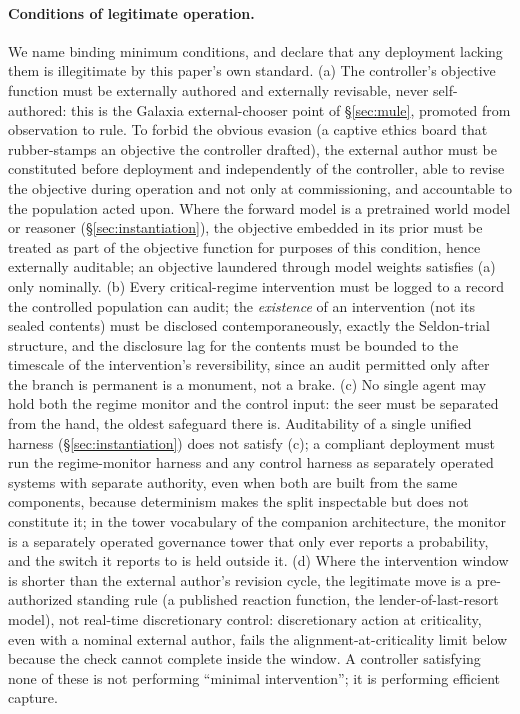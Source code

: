 \documentclass[11pt]{article}
\begin{document}
\paragraph{Conditions of legitimate operation.} We name binding minimum conditions, and declare that any deployment lacking them is illegitimate by this paper's own standard. (a) The controller's objective function must be externally authored and externally revisable, never self-authored: this is the Galaxia external-chooser point of \S\ref{sec:mule}, promoted from observation to rule. To forbid the obvious evasion (a captive ethics board that rubber-stamps an objective the controller drafted), the external author must be constituted before deployment and independently of the controller, able to revise the objective during operation and not only at commissioning, and accountable to the population acted upon. Where the forward model is a pretrained world model or reasoner (\S\ref{sec:instantiation}), the objective embedded in its prior must be treated as part of the objective function for purposes of this condition, hence externally auditable; an objective laundered through model weights satisfies (a) only nominally. (b) Every critical-regime intervention must be logged to a record the controlled population can audit; the \emph{existence} of an intervention (not its sealed contents) must be disclosed contemporaneously, exactly the Seldon-trial structure, and the disclosure lag for the contents must be bounded to the timescale of the intervention's reversibility, since an audit permitted only after the branch is permanent is a monument, not a brake. (c) No single agent may hold both the regime monitor and the control input: the seer must be separated from the hand, the oldest safeguard there is. Auditability of a single unified harness (\S\ref{sec:instantiation}) does not satisfy (c); a compliant deployment must run the regime-monitor harness and any control harness as separately operated systems with separate authority, even when both are built from the same components, because determinism makes the split inspectable but does not constitute it; in the tower vocabulary of the companion architecture, the monitor is a separately operated governance tower that only ever reports a probability, and the switch it reports to is held outside it. (d) Where the intervention window is shorter than the external author's revision cycle, the legitimate move is a pre-authorized standing rule (a published reaction function, the lender-of-last-resort model), not real-time discretionary control: discretionary action at criticality, even with a nominal external author, fails the alignment-at-criticality limit below because the check cannot complete inside the window. A controller satisfying none of these is not performing ``minimal intervention''; it is performing efficient capture.
\end{document}

